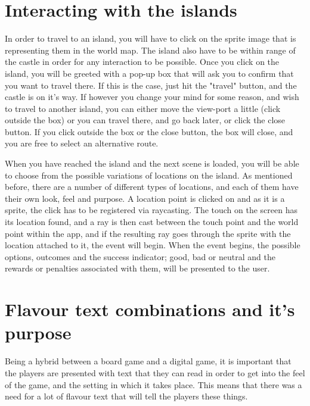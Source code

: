 \documentclass[a4paper,11pt]{report}
\begin{document}
\section{Interacting with the islands}
In order to travel to an island, you will have to click on the sprite image that is representing them in the world map. The island also have to be within range of the castle in order for any interaction to be possible. 
Once you click on the island, you will be greeted with a pop-up box that will ask you to confirm that you want to travel there. If this is the case, just hit the "travel" button, and the castle is on it's way. If however you change your mind for some reason, and wish to travel to another island, you can either move the view-port a little (click outside the box) or you can travel there, and go back later, or click the close button. If you click outside the box or the close button, the box will close, and you are free to select an alternative route.

When you have reached the island and the next scene is loaded, you will be able to choose from the possible variations of locations on the island. As mentioned before, there are a number of different types of locations, and each of them have their own look, feel and purpose.
A location point is clicked on and as it is a sprite, the click has to be registered via raycasting. The touch on the screen has its location found, and a ray is then cast between the touch point and the world point within the app, and if the resulting ray goes through the sprite with the location attached to it, the event will begin. When the event begins, the possible options, outcomes and the success indicator; good, bad or neutral and the rewards or penalties associated with them, will be presented to the user.

\section{Flavour text combinations and it's purpose}
Being a hybrid between a board game and a digital game, it is important that the players are presented with text that they can read in order to get into the feel of the game, and the setting in which it takes place. This means that there was a need for a lot of flavour text that will tell the players these things. 
\end{document}
